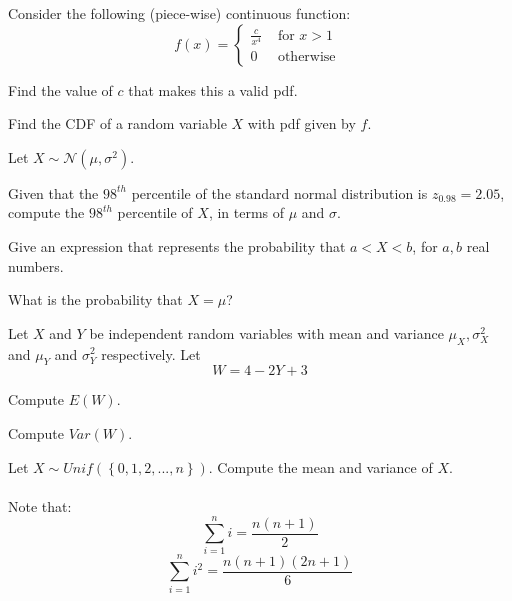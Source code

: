 \documentclass{article}
\begin{document}
\begin{problem}{20}
Consider the following (piece-wise) continuous function:
$$f(x) = \left\{
\begin{matrix}
 \frac{c}{x^4}& \textrm{ for } x>1\\
  0 &\textrm{ otherwise }
\end{matrix}\right.$$
\vspace{1pc}

Find the value of $c$ that makes this a valid pdf.
\vspace{1pc}

Find the CDF of a random variable $X$ with pdf given by $f$.
\end{problem}

\begin{problem}{20}
Let $X \sim \mathcal{N}(\mu,\sigma^2)$.  
\vspace{1pc}

Given that the $98^{th}$ percentile of the standard normal distribution is $z_{0.98} = 2.05$, compute the $98^{th}$ percentile of $X$, in terms of $\mu$ and $\sigma$.
\vspace{1pc}

Give an expression that represents the probability that $a<X<b$, for $a,b$ real numbers.
\vspace{1pc}

What is the probability that $X=\mu$?
\end{problem}
\vspace{1pc}

\begin{problem}{12}
Let $X$ and $Y$ be independent random variables with mean and variance $\mu_X,\sigma_X^2$ and $\mu_Y$ and $\sigma_Y^2$ respectively. Let
$$W= 4-2Y +3$$
\vspace{1pc}

Compute $E(W)$.
\vspace{1pc}

Compute $Var(W)$.

\end{problem}

\begin{problem}{20}
Let $X \sim Unif(\left\{0,1,2,...,n\right\})$. Compute the mean and variance of $X$. \\\\

Note that:
$$\sum_{i=1}^n i = \frac{n(n+1)}2$$
$$\sum_{i=1}^n i^2 = \frac{n(n+1)(2n+1)}6$$

\end{problem}
\end{document}
